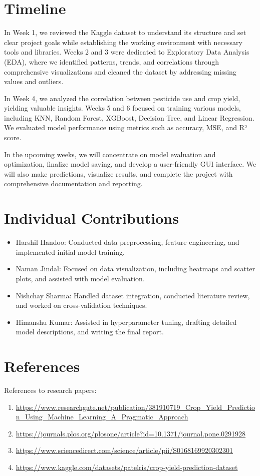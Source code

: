 \documentclass[10pt,twocolumn,letterpaper]{article}
\begin{document}
\section{Timeline}


In Week 1, we reviewed the Kaggle dataset to understand its structure and set clear project goals while establishing the working environment with necessary tools and libraries. Weeks 2 and 3 were dedicated to Exploratory Data Analysis (EDA), where we identified patterns, trends, and correlations through comprehensive visualizations and cleaned the dataset by addressing missing values and outliers. 

In Week 4, we analyzed the correlation between pesticide use and crop yield, yielding valuable insights. Weeks 5 and 6 focused on training various models, including KNN, Random Forest, XGBoost, Decision Tree, and Linear Regression. We evaluated model performance using metrics such as accuracy, MSE, and R² score.

In the upcoming weeks, we will concentrate on model evaluation and optimization, finalize model saving, and develop a user-friendly GUI interface. We will also make predictions, visualize results, and complete the project with comprehensive documentation and reporting.

\section{Individual Contributions}


\begin{itemize}[itemsep=-0.5em]
 \item Harshil Handoo: Conducted data preprocessing, feature engineering, and implemented initial model training.
\item Naman Jindal: Focused on data visualization, including heatmaps and scatter plots, and assisted with model evaluation.
 \item Nishchay Sharma: Handled dataset integration, conducted literature review, and worked on cross-validation techniques.
    \item Himanshu Kumar: Assisted in hyperparameter tuning, drafting detailed model descriptions, and writing the final report.
    \end{itemize}

\section{References}
References to research papers:

\begin{enumerate}
    \item \url{https://www.researchgate.net/publication/381910719_Crop_Yield_Prediction_Using_Machine_Learning_A_Pragmatic_Approach}
    \item \url{https://journals.plos.org/plosone/article?id=10.1371/journal.pone.0291928}
    \item \url{https://www.sciencedirect.com/science/article/pii/S0168169920302301}
    \item \url{https://www.kaggle.com/datasets/patelris/crop-yield-prediction-dataset}
\end{enumerate}
\end{document}
